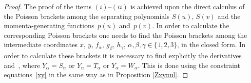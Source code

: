 \documentclass[pdftex]{sigma}
\def\a{\alpha}
\def\b{\beta}
\def\g{\gamma}
\numberwithin{equation}{section}
\begin{document}
\begin{proof}
The proof of the items $(i)$--$(ii)$ is achieved upon the direct calculus of the Poisson brackets
among the separating polynomials $S(u)$, $S(v)$ and the momenta-generating functions~$p(u)$ and~$p(v)$. In order to calculate the corresponding Poisson brackets one needs to find the
 Poisson brackets among the intermediate coordinates $x$, $y$, $f_{\a}$, $g_{\b}$, $h_{\g}$, $\a,\b,\g \in \{1,2,3\}$, in the closed form.
 In order to calculate these brackets it is necessary to find explicitly the derivatives~\smash{$\frac{\partial x}{\partial Y_{ \a}}$} and~\smash{$\frac{\partial y}{\partial Y_{ \a}}$}, where $Y_{\a}=S_{\a}$ or $Y_{\a}=T_{\a}$ or $Y_{\a}=W_{\a}$.
 This is done using the constraint equations~\eqref{xy} in the same way as in Proposition \ref{Zxynul}.


\end{proof}
\end{document}
